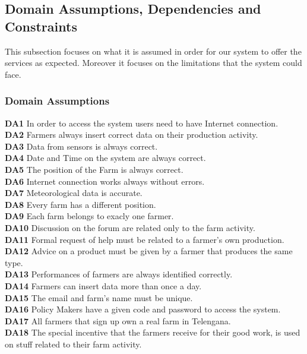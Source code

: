\subsection{Domain Assumptions, Dependencies and Constraints}
This subsection focuses on what it is assumed in order for our system to offer the services as expected.
Moreover it focuses on the limitations that the system could face.

\subsubsection{Domain Assumptions}
\textbf{DA1} In order to access the system users need to have Internet connection.\\
\textbf{DA2} Farmers always insert correct data on their production activity.\\
\textbf{DA3} Data from sensors is always correct.\\
\textbf{DA4} Date and Time on the system are always correct.\\
\textbf{DA5} The position of the Farm is always correct.\\
\textbf{DA6} Internet connection works always without errors.\\
\textbf{DA7} Meteorological data is accurate.\\
\textbf{DA8} Every farm has a different position.\\
\textbf{DA9} Each farm belongs to exacly one farmer.\\
\textbf{DA10} Discussion on the forum are related only to the farm activity.\\
\textbf{DA11} Formal request of help must be related to a farmer's own production.\\
\textbf{DA12} Advice on a product must be given by a farmer that produces the same type.\\
\textbf{DA13} Performances of farmers are always identified correctly.\\
\textbf{DA14} Farmers can insert data more than once a day.\\
\textbf{DA15} The email and farm's name must be unique.\\
\textbf{DA16} Policy Makers have a given code and password to access the system.\\
\textbf{DA17} All farmers that sign up own a real farm in Telengana.\\
\textbf{DA18} The special incentive that the farmers receive for their good work, is used on stuff related to their farm activity.\\

